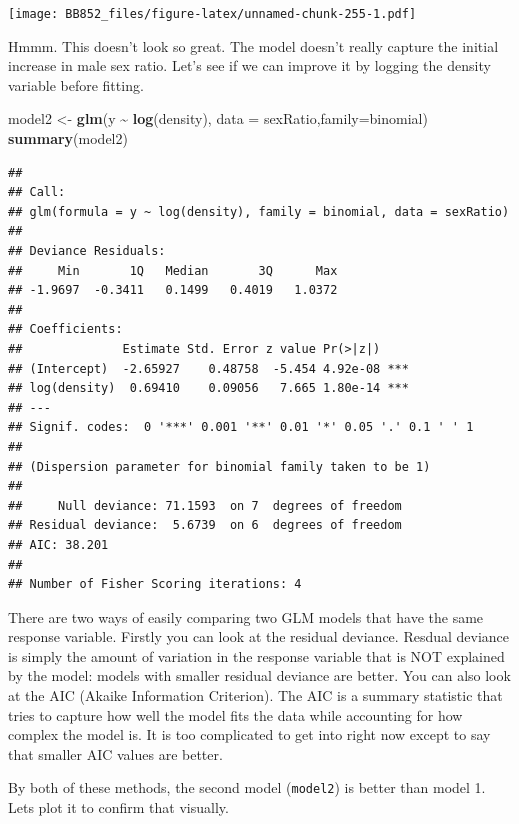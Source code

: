 \documentclass[
  a4paperpaper,
]{book}
\newenvironment{Shaded}{\begin{snugshade}}{\end{snugshade}}
\newcommand{\DataTypeTok}[1]{\textcolor[rgb]{0.13,0.29,0.53}{#1}}
\newcommand{\KeywordTok}[1]{\textcolor[rgb]{0.13,0.29,0.53}{\textbf{#1}}}
\newcommand{\NormalTok}[1]{#1}
\newcommand{\OperatorTok}[1]{\textcolor[rgb]{0.81,0.36,0.00}{\textbf{#1}}}
\newcommand{\StringTok}[1]{\textcolor[rgb]{0.31,0.60,0.02}{#1}}
\begin{document}
\texttt{[image: BB852\_files/figure-latex/unnamed-chunk-255-1.pdf]}

Hmmm. This doesn't look so great. The model doesn't really capture the initial increase in male sex ratio. Let's see if we can improve it by logging the density variable before fitting.

\begin{Shaded}
\begin{Highlighting}[]
\NormalTok{model2 \textless{}{-}}\StringTok{ }\KeywordTok{glm}\NormalTok{(y }\OperatorTok{\textasciitilde{}}\StringTok{ }\KeywordTok{log}\NormalTok{(density), }\DataTypeTok{data =}\NormalTok{ sexRatio,}\DataTypeTok{family=}\NormalTok{binomial)}
\KeywordTok{summary}\NormalTok{(model2)  }
\end{Highlighting}
\end{Shaded}

\begin{verbatim}
## 
## Call:
## glm(formula = y ~ log(density), family = binomial, data = sexRatio)
## 
## Deviance Residuals: 
##     Min       1Q   Median       3Q      Max  
## -1.9697  -0.3411   0.1499   0.4019   1.0372  
## 
## Coefficients:
##              Estimate Std. Error z value Pr(>|z|)    
## (Intercept)  -2.65927    0.48758  -5.454 4.92e-08 ***
## log(density)  0.69410    0.09056   7.665 1.80e-14 ***
## ---
## Signif. codes:  0 '***' 0.001 '**' 0.01 '*' 0.05 '.' 0.1 ' ' 1
## 
## (Dispersion parameter for binomial family taken to be 1)
## 
##     Null deviance: 71.1593  on 7  degrees of freedom
## Residual deviance:  5.6739  on 6  degrees of freedom
## AIC: 38.201
## 
## Number of Fisher Scoring iterations: 4
\end{verbatim}

There are two ways of easily comparing two GLM models that have the same response variable. Firstly you can look at the residual deviance. Resdual deviance is simply the amount of variation in the response variable that is NOT explained by the model: models with smaller residual deviance are better. You can also look at the AIC (Akaike Information Criterion). The AIC is a summary statistic that tries to capture how well the model fits the data while accounting for how complex the model is. It is too complicated to get into right now except to say that smaller AIC values are better.

By both of these methods, the second model (\texttt{model2}) is better than model 1. Lets plot it to confirm that visually.
\end{document}
